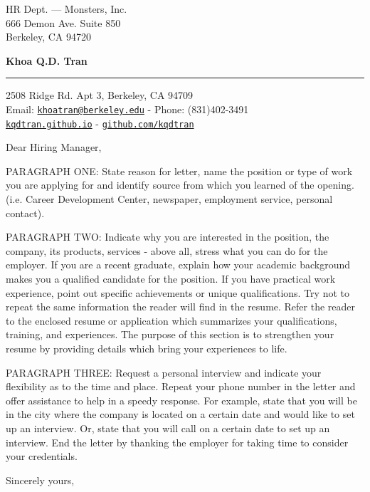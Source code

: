 \documentclass{letter} %
\begin{document}
\longindentation=0pt                       %
\let\raggedleft\raggedright                %
 
\begin{letter}{HR Dept. --- Monsters, Inc. \\
666 Demon Ave. Suite 850 \\
Berkeley, CA 94720}

\begin{center}
{\large\bf Khoa Q.D. Tran} 
\end{center}
\medskip\hrule height 0.3pt
\begin{center}
{2508 Ridge Rd. Apt 3, Berkeley, CA 94709 \\   
Email: \href{mailto:khoatran@berkeley.edu}{\tt{khoatran@berkeley.edu}} - Phone: (831)402-3491 \\
\href{http://kqdtran.github.io/}{\tt{kqdtran.github.io}} - \href{https://github.com/kqdtran}{\tt{github.com/kqdtran}} } 
\end{center} \vfill %
 
\opening{Dear Hiring Manager,} 
 
\noindent PARAGRAPH ONE: State reason for letter, name the position or type 
of work you are applying for and identify source from  which  you 
learned   of   the  opening.  (i.e.  Career  Development  Center, 
newspaper, employment service, personal contact). 
 
\noindent PARAGRAPH  TWO:  Indicate why you are interested in the position, 
the company, its products, services - above all, stress what  you 
can  do  for  the employer. If you are a recent graduate, explain 
how your academic background makes you a qualified candidate  for 
the  position.  If  you have practical work experience, point out 
specific achievements or unique qualifications. Try not to repeat 
the  same  information  the reader will find in the resume. Refer 
the reader to the enclosed resume or application which summarizes 
your  qualifications,  training,  and experiences. The purpose of 
this section is to strengthen your resume  by  providing  details 
which bring your experiences to life. 
 
\noindent PARAGRAPH THREE: Request a personal interview and  indicate  your 
flexibility as to the time and place. Repeat your phone number in 
the letter and offer assistance to help in a speedy response. For 
example,  state that you will be in the city where the company is 
located on a certain date and would like to set up an  interview. 
Or,  state  that  you  will  call  on a certain date to set up an 
interview. End the letter by thanking  the  employer  for  taking 
time to consider your credentials. 
 
\closing{Sincerely yours, }

\end{letter}
\end{document}
